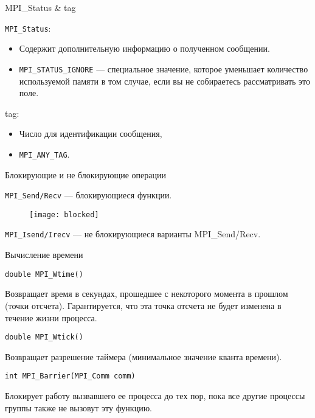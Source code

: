 \begin{frame}{MPI_Status \& tag}

\texttt{MPI_Status}:

\begin{itemize}
	\item Содержит дополнительную информацию о полученном сообщении.
	\item \texttt{MPI_STATUS_IGNORE} --- специальное значение, которое уменьшает количество используемой памяти в том случае, если вы не собираетесь рассматривать это поле.
\end{itemize}

\vfill

tag:

\begin{itemize}
	\item Число для идентификации сообщения,
	\item \texttt{MPI_ANY_TAG}.
\end{itemize}

\end{frame}

\begin{frame}{Блокирующие и не блокирующие операции}

\texttt{MPI_Send/Recv} --- блокирующиеся функции.

\begin{figure}[htp]
	\centering
	\texttt{[image: blocked]}
\end{figure}

\texttt{MPI_Isend/Irecv} --- не блокирующиеся варианты MPI_Send/Recv.

\end{frame}

\begin{frame}[fragile]{Вычисление времени}

\begin{lstlisting}
double MPI_Wtime()
\end{lstlisting}

Возвращает время в секундах, прошедшее с  некоторого момента в прошлом (точки отсчета). Гарантируется, что эта точка отсчета не будет изменена в течение жизни процесса.

\begin{lstlisting}
double MPI_Wtick()
\end{lstlisting}

Возвращает разрешение таймера (минимальное значение кванта времени). 

\begin{lstlisting}
int MPI_Barrier(MPI_Comm comm)
\end{lstlisting}

Блокирует работу вызвавшего ее процесса до тех пор, пока все другие процессы группы также не вызовут эту функцию.

\end{frame}

